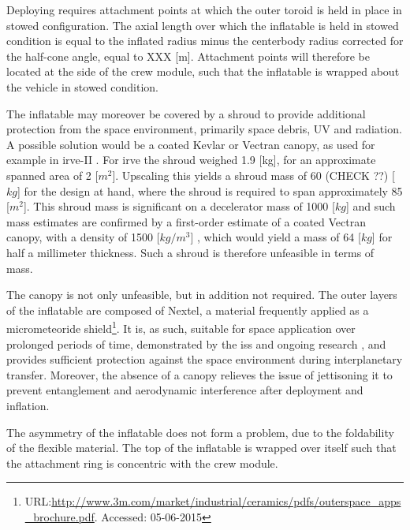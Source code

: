 Deploying requires attachment points at which the outer toroid is held in place in stowed configuration. The axial length over which the inflatable is held in stowed condition is equal to the inflated radius minus the centerbody radius corrected for the half-cone angle, equal to XXX [m]. Attachment points will therefore be located at the side of the crew module, such that the inflatable is wrapped about the vehicle in stowed condition. 

The inflatable may moreover be covered by a shroud to provide additional protection from the space environment, primarily space debris, UV and radiation. A possible solution would be a coated Kevlar or Vectran canopy, as used for example in \gls{irve}-II \cite{Dillman2010}. For \gls{irve} the shroud weighed 1.9 [kg], for an approximate spanned area of 2 [$m^{2}$]. Upscaling this yields a shroud mass of 60 (CHECK ??) [$kg$] for the design at hand, where the shroud is required to span approximately 85 [$m^{2}$]. This shroud mass is significant on a decelerator mass of 1000 [$kg$] and such mass estimates are confirmed by a first-order estimate of a coated Vectran canopy, with a density of 1500 [$kg/m^{3}$] \cite{Miller2014}, which would yield a mass of 64 [$kg$] for half a millimeter thickness. Such a shroud is therefore unfeasible in terms of mass.

The canopy is not only unfeasible, but in addition not required. The outer layers of the inflatable are composed of Nextel, a material frequently applied as a micrometeoride shield\footnote{URL:\url{http://www.3m.com/market/industrial/ceramics/pdfs/outerspace_apps_brochure.pdf}. Accessed: 05-06-2015}. It is, as such, suitable for space application over prolonged periods of time, demonstrated by the \gls{iss} and ongoing research \cite{Thoma2005}, and provides sufficient protection against the space environment during interplanetary transfer. Moreover, the absence of a canopy relieves the issue of jettisoning it to prevent entanglement and aerodynamic interference after deployment and inflation.

The asymmetry of the inflatable does not form a problem, due to the foldability of the flexible material. The top of the inflatable is wrapped over itself such that the attachment ring is concentric with the crew module. 

